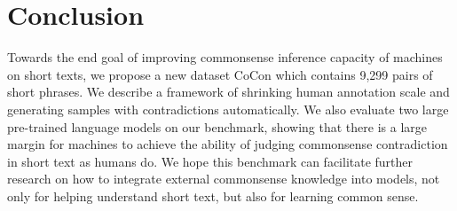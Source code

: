 \section{Conclusion}
Towards the end goal of improving commonsense inference capacity of machines on short texts, 
we propose a new dataset CoCon which contains 9,299 pairs of short phrases. 
We describe a framework of shrinking human annotation scale and generating samples with contradictions automatically. 
We also evaluate two large pre-trained language models on our benchmark, 
showing that there is a large margin for machines to achieve the ability of judging commonsense contradiction in short text as humans do. 
We hope this benchmark can facilitate further research on how to integrate external commonsense knowledge into models, not only for helping understand short text, but also for learning common sense.